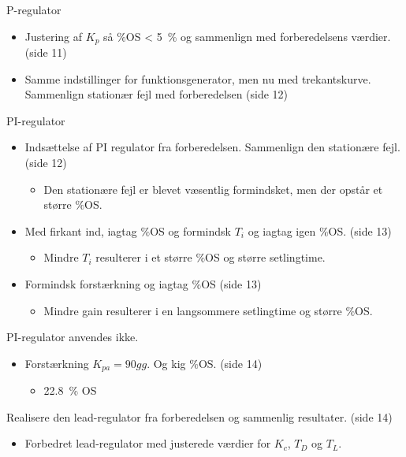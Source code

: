 \documentclass[danish]{article}
\begin{document}
\vspace{3mm}
P-regulator
\begin{itemize}
	\item Justering af $K_p$ så $\si{\percent}$OS < \SI{5}{\percent} og sammenlign med forberedelsens værdier. (side 11)
	\item Samme indstillinger for funktionsgenerator, men nu med trekantskurve. Sammenlign stationær fejl med forberedelsen (side 12)
\end{itemize}
\vspace{3mm}
PI-regulator
\begin{itemize}
	\item 	Indsættelse af PI regulator fra forberedelsen. Sammenlign den stationære fejl. (side 12)
	\begin{itemize}
		\item Den stationære fejl er blevet væsentlig formindsket, men der opstår et større $\si{\percent}$OS.
	\end{itemize}
	\item Med firkant ind, iagtag $\si{\percent}$OS og formindsk $T_i$ og iagtag igen $\si{\percent}$OS. (side 13)
	\begin{itemize}
		\item Mindre $T_i$ resulterer i et større $\si{\percent}$OS og større setlingtime.
	\end{itemize}
	\item Formindsk forstærkning og iagtag $\si{\percent}$OS (side 13)
	\begin{itemize}
		\item Mindre gain resulterer i en langsommere setlingtime og større $\si{\percent}$OS.
	\end{itemize}
\end{itemize}
\vspace{3mm}
PI-regulator anvendes ikke.
\begin{itemize}
	\item Forstærkning $K_{pa} = 90 gg$. Og kig $\si{\percent}$OS. (side 14)
	\begin{itemize}
		\item \SI{22,8}{\percent} OS
	\end{itemize}
\end{itemize}
Realisere den lead-regulator fra forberedelsen og sammenlig resultater. (side 14)
\begin{itemize}
	\item Forbedret lead-regulator med justerede værdier for $K_c$, $T_D$ og $T_L$.
\end{itemize}
\end{document}
